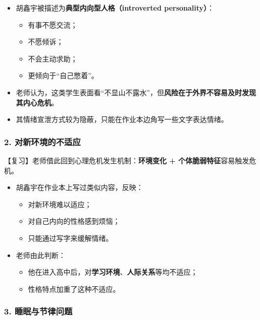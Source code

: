 \documentclass[
  chinese,
  9pt,
  a4paper,
]{ctexart}
\providecommand{\tightlist}{%
  \setlength{\itemsep}{0pt}\setlength{\parskip}{0pt}}
\begin{document}
\begin{itemize}
\item
  胡鑫宇被描述为\textbf{典型内向型人格（introverted personality）}：

  \begin{itemize}
  \tightlist
  \item
    有事不愿交流；
  \item
    不愿倾诉；
  \item
    不会主动求助；
  \item
    更倾向于``自己憋着''。
  \end{itemize}
\item
  老师认为，这类学生表面看``不显山不露水''，但\textbf{风险在于外界不容易及时发现其内心危机}。
\item
  其情绪宣泄方式较为隐蔽，只能在作业本边角写一些文字表达情绪。
\end{itemize}

\subsubsection{2.
对新环境的不适应}\label{ux5bf9ux65b0ux73afux5883ux7684ux4e0dux9002ux5e94}

【复习】老师借此回到心理危机发生机制：\textbf{环境变化 +
个体脆弱特征}容易触发危机。

\begin{itemize}
\item
  胡鑫宇在作业本上写过类似内容，反映：

  \begin{itemize}
  \tightlist
  \item
    对新环境难以适应；
  \item
    对自己内向的性格感到烦恼；
  \item
    只能通过写字来缓解情绪。
  \end{itemize}
\item
  老师由此判断：

  \begin{itemize}
  \tightlist
  \item
    他在进入高中后，对\textbf{学习环境}、\textbf{人际关系}等均不适应；
  \item
    性格特点加重了这种不适应。
  \end{itemize}
\end{itemize}

\subsubsection{3.
睡眠与节律问题}\label{ux7761ux7720ux4e0eux8282ux5f8bux95eeux9898}
\end{document}
